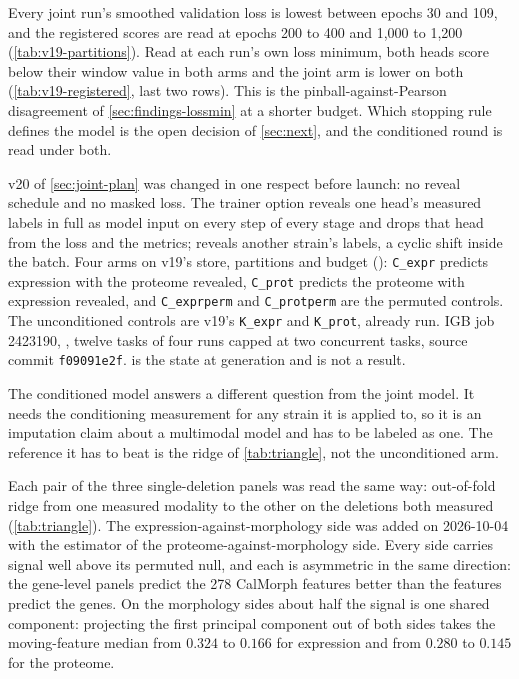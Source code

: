  Every
joint run's smoothed validation loss is lowest between epochs 30 and 109, and the registered
scores are read at epochs 200 to 400 and 1,000 to 1,200 (\cref{tab:v19-partitions}). Read at
each run's own loss minimum, both heads score below their window value in both arms and
the joint arm is lower on both (\cref{tab:v19-registered}, last two rows). This is the
pinball-against-Pearson disagreement of \cref{sec:findings-lossmin} at a shorter budget.
Which stopping rule defines the model is the open decision of \cref{sec:next}, and the
conditioned round is read under both.

 v20 of
\cref{sec:joint-plan} was changed in one respect before launch: no reveal schedule and no
masked loss. The trainer option  reveals one head's measured
labels in full as model input on every step of every stage and drops that head from the loss
and the metrics;  reveals another strain's labels, a cyclic shift
inside the batch. Four arms on v19's store, partitions and budget
(): \texttt{C\_expr} predicts expression with the
proteome revealed, \texttt{C\_prot} predicts the proteome with expression revealed, and
\texttt{C\_exprperm} and \texttt{C\_protperm} are the permuted controls. The unconditioned
controls are v19's \texttt{K\_expr} and \texttt{K\_prot}, already run. IGB job 2423190,
, twelve tasks of four runs capped at two concurrent tasks, source commit
\texttt{f09091e2f}.  is the state at generation and is not a result.



The conditioned model answers a different question from the joint model. It needs the
conditioning measurement for any strain it is applied to, so it is an imputation claim about
a multimodal model and has to be labeled as one. The reference it has to beat is the ridge of
\cref{tab:triangle}, not the unconditioned arm.

 Each pair of the three single-deletion panels was read
the same way: out-of-fold ridge from one measured modality to the other on the deletions
both measured (\cref{tab:triangle}). The expression-against-morphology side was added on
2026-10-04 with the estimator of the proteome-against-morphology side. Every side carries
signal well above its permuted null, and each is asymmetric in the same direction: the
gene-level panels predict the 278 CalMorph features better than the features predict the
genes. On the morphology sides about half the signal is one shared component: projecting
the first principal component out of both sides takes the moving-feature median from $0.324$
to $0.166$ for expression and from $0.280$ to $0.145$ for the proteome.

